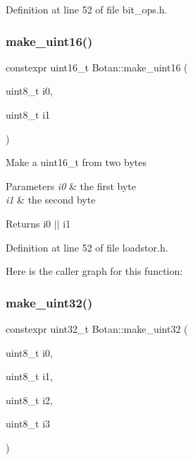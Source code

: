Definition at line 52 of file bit\+\_\+ops.\+h.

\mbox{\label{namespace_botan_afa1f23105ed52b51390e214db16b6900}} 
\subsubsection{\texorpdfstring{make\+\_\+uint16()}{make\_uint16()}}
{\footnotesize\ttfamily constexpr uint16\+\_\+t Botan\+::make\+\_\+uint16 (\begin{DoxyParamCaption}\item[{uint8\+\_\+t}]{i0,  }\item[{uint8\+\_\+t}]{i1 }\end{DoxyParamCaption})\hspace{0.3cm}{\ttfamily [inline]}}

Make a uint16\+\_\+t from two bytes 
\begin{DoxyParams}{Parameters}
{\em i0} & the first byte \\
\hline
{\em i1} & the second byte \\
\hline
\end{DoxyParams}
\begin{DoxyReturn}{Returns}
i0 $\vert$$\vert$ i1 
\end{DoxyReturn}


Definition at line 52 of file loadstor.\+h.

Here is the caller graph for this function\+:
\mbox{\label{namespace_botan_a690f1a5eaa98c00b71ef8320322e722e}} 
\subsubsection{\texorpdfstring{make\+\_\+uint32()}{make\_uint32()}}
{\footnotesize\ttfamily constexpr uint32\+\_\+t Botan\+::make\+\_\+uint32 (\begin{DoxyParamCaption}\item[{uint8\+\_\+t}]{i0,  }\item[{uint8\+\_\+t}]{i1,  }\item[{uint8\+\_\+t}]{i2,  }\item[{uint8\+\_\+t}]{i3 }\end{DoxyParamCaption})\hspace{0.3cm}{\ttfamily [inline]}}


